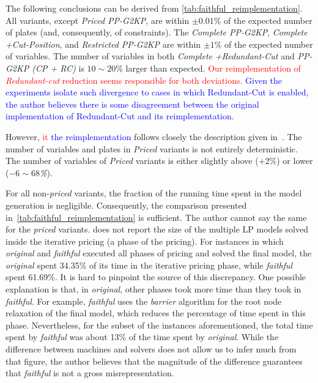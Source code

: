 \documentclass[ppgc,tese,english,formais,babel]{iiufrgs}
\newif\iffinalversion
\newcommand{\newtext}[1]{\iffinalversion%
#1%
\else%
\textcolor{blue}{#1}%
\fi%
}
\newcommand{\oldtext}[1]{\iffinalversion%
\else%
\textcolor{red}{#1}%
\fi%
}
\begin{document}
The following conclusions can be derived from \cref{tab:faithful_reimplementation}.
All variants, except \emph{Priced PP-G2KP}, are within \(\pm0.01\)\% of the expected number of plates (and, consequently, of constraints).
The \emph{Complete PP-G2KP}, \emph{Complete +Cut-Position}, and \emph{Restricted PP-G2KP} are within \(\pm1\)\% of the expected number of variables.
The number of variables in both \emph{Complete +Redundant-Cut} and \emph{PP-G2KP (CP + RC)} is \(10\sim20\)\% larger than expected.
\oldtext{Our reimplementation of \emph{Redundant-cut} reduction seems responsible for both deviations.}\newtext{Given the experiments isolate such divergence to cases in which Redundant-Cut is enabled, the author believes there is some disagreement between the original implementation of Redundant-Cut and its reimplementation.}
However, \oldtext{it}\newtext{the reimplementation} follows closely the description given in~\citet{dimitri_thesis}.
The number of variables and plates in \emph{Priced} variants is not entirely deterministic.
The number of variables of \emph{Priced} variants is either slightly above (\(+2\)\%) or lower (\emph{\(-6\sim68\)\%}).

For all non-\emph{priced} variants, the fraction of the running time spent in the model generation is negligible.
Consequently, the comparison presented in~\cref{tab:faithful_reimplementation} is sufficient.
The author cannot say the same for the \emph{priced} variants.
\citet{dimitri_thesis} does not report the size of the multiple LP models solved inside the iterative pricing (a phase of the pricing).
For instances in which \emph{original} and \emph{faithful} executed all phases of pricing and solved the final model, the \emph{original} spent 34.35\% of its time in the iterative pricing phase, while \emph{faithful} spent 61.69\%.
It is hard to pinpoint the source of this discrepancy.
One possible explanation is that, in \emph{original}, other phases took more time than they took in \emph{faithful}.
For example, \emph{faithful} uses the \emph{barrier} algorithm for the root node relaxation of the final model, which reduces the percentage of time spent in this phase.
Nevertheless, for the subset of the instances aforementioned, the total time spent by \emph{faithful} was about 13\% of the time spent by \emph{original}.
While the difference between machines and solvers does not allow us to infer much from that figure, the author believes that the magnitude of the difference guarantees that \emph{faithful} is not a gross misrepresentation.
\end{document}
